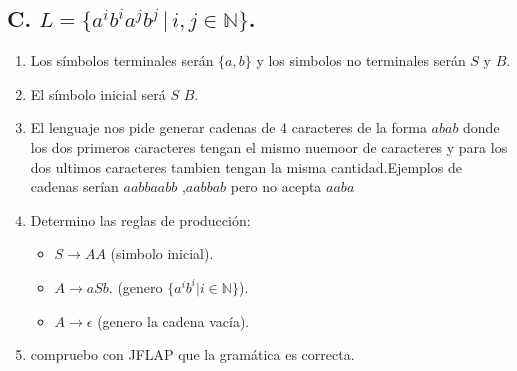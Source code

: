 \documentclass{article}
\begin{document}
        
        \newpage %
        \subsection*{C. $L = \{a^i b^i a^j b^j \, | \, i, j \in \mathbb{N}\}$.}
        \begin{flushleft}
            \begin{enumerate}
                \item Los símbolos terminales serán $\{a,b\}$ y los simbolos no terminales serán $S$ y $B$.
                \item El símbolo inicial será $S$ $B$.
                \item El lenguaje nos pide generar cadenas de 4 caracteres de la forma $abab$ donde los dos primeros caracteres tengan 
                el mismo nuemoor de caracteres y para los dos ultimos caracteres tambien tengan la misma cantidad.Ejemplos de cadenas serían $aabbaabb$ ,$aabbab$ pero no acepta $aaba$
                \item Determino las reglas de producción:
                \begin{itemize}
                    \item $S \rightarrow AA$ (simbolo inicial).
                    \item $A \rightarrow aSb$. (genero $\{a^i b^i | i \in \mathbb{N}\}$).
                    \item $A \rightarrow \epsilon$ (genero la cadena vacía).
                \end{itemize}

                \item compruebo con JFLAP que la gramática es correcta.
                

            \end{enumerate}
        \end{flushleft}



    
\end{document}
